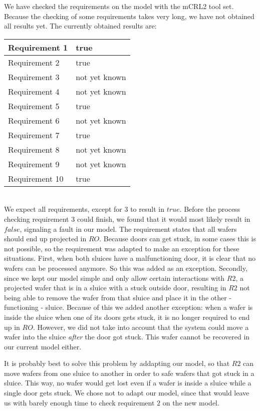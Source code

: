 
We have checked the requirements on the model with the mCRL2 tool set. Because the checking of some requirements takes very long, we have not obtained all results yet. The currently obtained results are:\\


\begin{tabular}{|l|l|}
\hline
Requirement 1 & true \\
\hline
Requirement 2 & true \\
\hline
Requirement 3 & not yet known \\
\hline
Requirement 4 & not yet known \\
\hline
Requirement 5 & true \\
\hline
Requirement 6 & not yet known \\
\hline
Requirement 7 & true \\
\hline
Requirement 8 & not yet known \\
\hline
Requirement 9 & not yet known \\
\hline
Requirement 10 & true \\
\hline
\end{tabular} \\


We expect all requirements, except for $3$ to result in $true$. Before the process checking requirement $3$ could finish, we found that it would most likely result in $false$, signaling a fault in our model. The requirement states that all wafers should end up projected in $RO$. Because doors can get stuck, in some cases this is not possible, so the requirement was adapted to make an exception for these situations. First, when both sluices have a malfunctioning door, it is clear that no wafers can be processed anymore. So this was added as an exception. Secondly, since we kept our model simple and only allow certain interactions with $R2$, a projected wafer that is in a sluice with a stuck outside door, resulting in $R2$ not being able to remove the wafer from that sluice and place it in the other - functioning - sluice. Because of this we added another exception: when a wafer is inside the sluice when one of its doors gets stuck, it is no longer required to end up in $RO$. However, we did not take into account that the system could move a wafer into the sluice \emph{after} the door got stuck. This wafer cannot be recovered in our current model either.

It is probably best to solve this problem by addapting our model, so that $R2$ can move wafers from one sluice to another in order to safe wafers that got stuck in a sluice. This way, no wafer would get lost even if a wafer is inside a sluice while a single door gets stuck. We chose not to adapt our model, since that would leave us with barely enough time to check requirement $2$ on the new model.

